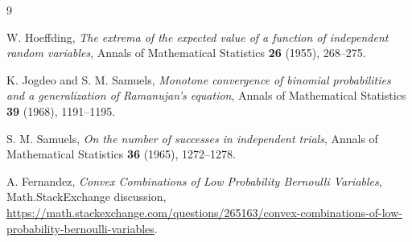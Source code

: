 \documentclass[12pt]{article}
\theoremstyle{definition}
\theoremstyle{plain}
\theoremstyle{remark}
\begin{document}
\begin{thebibliography}{9}

W. Hoeffding,
\emph{The extrema of the expected value of a function of independent random variables},
Annals of Mathematical Statistics \textbf{26} (1955), 268--275.

K. Jogdeo and S. M. Samuels,
\emph{Monotone convergence of binomial probabilities and a generalization of Ramanujan's equation},
Annals of Mathematical Statistics \textbf{39} (1968), 1191--1195.

S. M. Samuels,
\emph{On the number of successes in independent trials},
Annals of Mathematical Statistics \textbf{36} (1965), 1272--1278.

A. Fernandez,
\emph{Convex Combinations of Low Probability Bernoulli Variables},
Math.StackExchange discussion,
\url{https://math.stackexchange.com/questions/265163/convex-combinations-of-low-probability-bernoulli-variables}.

\end{thebibliography}
\end{document}
